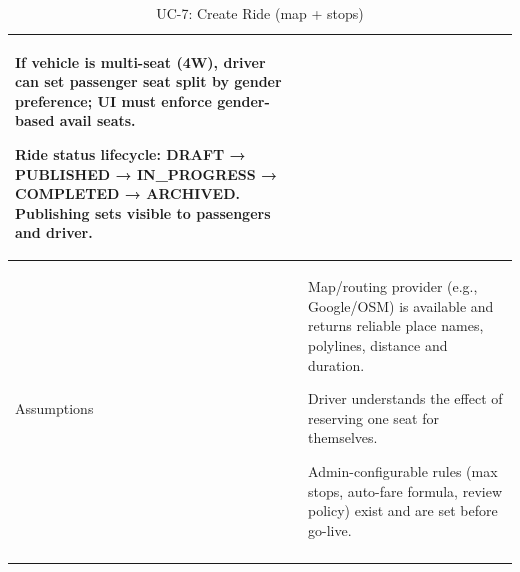 \begin{longtable}{|p{3.5cm}|p{12cm}|}
If vehicle is multi-seat (4W), driver can set passenger seat split by gender preference; UI must enforce gender-based avail seats.

Ride status lifecycle: DRAFT → PUBLISHED → IN\_PROGRESS → COMPLETED → ARCHIVED. Publishing sets visible to passengers and driver. \\
\hline
Assumptions &
Map/routing provider (e.g., Google/OSM) is available and returns reliable place names, polylines, distance and duration.

Driver understands the effect of reserving one seat for themselves.

Admin-configurable rules (max stops, auto-fare formula, review policy) exist and are set before go-live. \\
\hline
\caption{UC-7: Create Ride (map + stops)}
\end{longtable}

